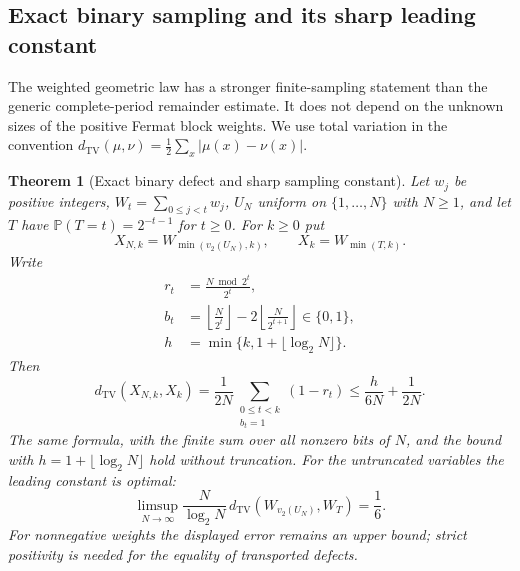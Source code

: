 \documentclass[11pt]{article}
\newtheorem{theorem}{Theorem}[section]
\theoremstyle{definition}
\begin{document}
\subsection{Exact binary sampling and its sharp leading constant}
\label{sec:binary-sampling}

The weighted geometric law has a stronger finite-sampling statement
than the generic complete-period remainder estimate.  It does not
depend on the unknown sizes of the positive Fermat block weights.
We use total variation in the convention
$d_{\mathrm{TV}}(\mu,\nu)=\frac12\sum_x|\mu(x)-\nu(x)|$.

\begin{theorem}[Exact binary defect and sharp sampling constant]
\label{thm:binary-sampling}
Let $w_j$ be positive integers, $W_t=\sum_{0\le j<t}w_j$,
$U_N$ uniform on $\{1,\ldots,N\}$ with $N\ge1$, and let $T$
have $\mathbb P(T=t)=2^{-t-1}$ for $t\ge0$.
For $k\ge0$ put
\[
 X_{N,k}=W_{\min(v_2(U_N),k)},\qquad X_k=W_{\min(T,k)}.
\]
Write
\begin{align*}
 r_t&=\frac{N\bmod 2^t}{2^t},\\
 b_t&=\left\lfloor\frac{N}{2^t}\right\rfloor
       -2\left\lfloor\frac{N}{2^{t+1}}\right\rfloor\in\{0,1\},\\
 h&=\min\{k,1+\lfloor\log_2N\rfloor\}.
\end{align*}
Then
\[
 d_{\mathrm{TV}}(X_{N,k},X_k)
 =\frac1{2N}\sum_{\substack{0\le t<k\\b_t=1}}(1-r_t)
 \le \frac{h}{6N}+\frac1{2N}.
\]
The same formula, with the finite sum over all nonzero bits of $N$,
and the bound with $h=1+\lfloor\log_2N\rfloor$ hold without truncation.
For the untruncated variables the leading constant is optimal:
\[
 \limsup_{N\to\infty}
 \frac{N}{\log_2N}\,
 d_{\mathrm{TV}}(W_{v_2(U_N)},W_T)=\frac16.
\]
For nonnegative weights the displayed error remains an upper bound;
strict positivity is needed for the equality of transported defects.
\end{theorem}
\end{document}
